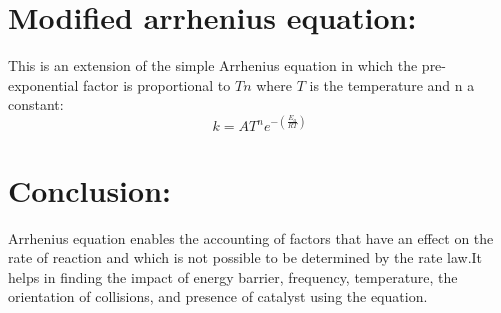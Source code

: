 \documentclass[a4paper]{article}
\begin{document}
\section{\textbf{Modified arrhenius equation:}}
This is an extension of the simple Arrhenius equation in which the pre-exponential factor is proportional to $Tn$ where $T$ is the temperature and n a constant:~\cite{ref=r1}
$$k=AT^ne^{-(\frac{E_a}{RT})}$$

\section{\textbf{Conclusion:}}
Arrhenius equation enables the accounting of factors that have an effect on the rate of reaction and which is not possible to be determined by the rate law.It helps in finding the impact of energy barrier, frequency, temperature, the orientation of collisions, and presence of catalyst using the equation.
\newpage




\end{document}
